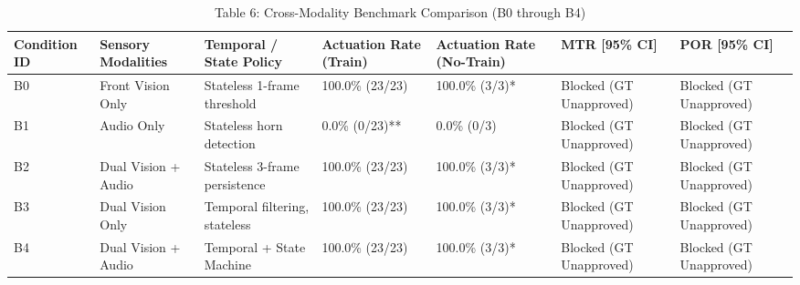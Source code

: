 \begin{table}[t]
\centering
\caption{Table 6: Cross-Modality Benchmark Comparison (B0 through B4)}
\label{tab:table06_modality_comparison}
\begin{tabular}{lllllll}
\hline
Condition ID & Sensory Modalities & Temporal / State Policy & Actuation Rate (Train) & Actuation Rate (No-Train) & MTR [95\% CI] & POR [95\% CI] \\
\hline
B0 & Front Vision Only & Stateless 1-frame threshold & 100.0\% (23/23) & 100.0\% (3/3)* & Blocked (GT Unapproved) & Blocked (GT Unapproved) \\
B1 & Audio Only & Stateless horn detection & 0.0\% (0/23)** & 0.0\% (0/3) & Blocked (GT Unapproved) & Blocked (GT Unapproved) \\
B2 & Dual Vision + Audio & Stateless 3-frame persistence & 100.0\% (23/23) & 100.0\% (3/3)* & Blocked (GT Unapproved) & Blocked (GT Unapproved) \\
B3 & Dual Vision Only & Temporal filtering, stateless & 100.0\% (23/23) & 100.0\% (3/3)* & Blocked (GT Unapproved) & Blocked (GT Unapproved) \\
B4 & Dual Vision + Audio & Temporal + State Machine & 100.0\% (23/23) & 100.0\% (3/3)* & Blocked (GT Unapproved) & Blocked (GT Unapproved) \\
\hline
\end{tabular}
\end{table}
